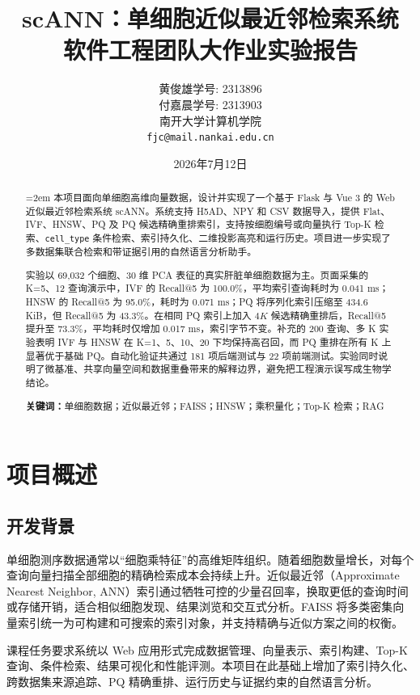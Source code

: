 \documentclass[11pt,a4paper]{article}
\title{\textbf{scANN：单细胞近似最近邻检索系统\\软件工程团队大作业实验报告}}
\author{黄俊雄\quad 学号: 2313896\\
付嘉晨\quad 学号: 2313903\\
南开大学计算机学院\\
\texttt{fjc@mail.nankai.edu.cn}}
\date{2026年7月12日}
\newcommand{\code}[1]{\texttt{#1}}
\begin{document}
\maketitle

\begin{abstract}
\parindent=2em
本项目面向单细胞高维向量数据，设计并实现了一个基于 Flask 与 Vue 3 的 Web 近似最近邻检索系统 scANN。系统支持 H5AD、NPY 和 CSV 数据导入，提供 Flat、IVF、HNSW、PQ 及 PQ 候选精确重排索引，支持按细胞编号或向量执行 Top-K 检索、\code{cell\_type} 条件检索、索引持久化、二维投影高亮和运行历史。项目进一步实现了多数据集联合检索和带证据引用的自然语言分析助手。

实验以 69,032 个细胞、30 维 PCA 表征的真实肝脏单细胞数据为主。页面采集的 K=5、12 查询演示中，IVF 的 Recall@5 为 100.0\%，平均索引查询耗时为 0.041 ms；HNSW 的 Recall@5 为 95.0\%，耗时为 0.071 ms；PQ 将序列化索引压缩至 434.6 KiB，但 Recall@5 为 43.3\%。在相同 PQ 索引上加入 $4K$ 候选精确重排后，Recall@5 提升至 73.3\%，平均耗时仅增加 0.017 ms，索引字节不变。补充的 200 查询、多 K 实验表明 IVF 与 HNSW 在 K=1、5、10、20 下均保持高召回，而 PQ 重排在所有 K 上显著优于基础 PQ。自动化验证共通过 181 项后端测试与 22 项前端测试。实验同时说明了微基准、共享向量空间和数据重叠带来的解释边界，避免把工程演示误写成生物学结论。

\noindent\textbf{关键词：}单细胞数据；近似最近邻；FAISS；HNSW；乘积量化；Top-K 检索；RAG
\end{abstract}

\tableofcontents
\newpage

\section{项目概述}

\subsection{开发背景}

单细胞测序数据通常以“细胞乘特征”的高维矩阵组织。随着细胞数量增长，对每个查询向量扫描全部细胞的精确检索成本会持续上升。近似最近邻（Approximate Nearest Neighbor, ANN）索引通过牺牲可控的少量召回率，换取更低的查询时间或存储开销，适合相似细胞发现、结果浏览和交互式分析。FAISS 将多类密集向量索引统一为可构建和可搜索的索引对象，并支持精确与近似方案之间的权衡\cite{faisswiki}。

课程任务要求系统以 Web 应用形式完成数据管理、向量表示、索引构建、Top-K 查询、条件检索、结果可视化和性能评测。本项目在此基础上增加了索引持久化、跨数据集来源追踪、PQ 精确重排、运行历史与证据约束的自然语言分析。
\end{document}

